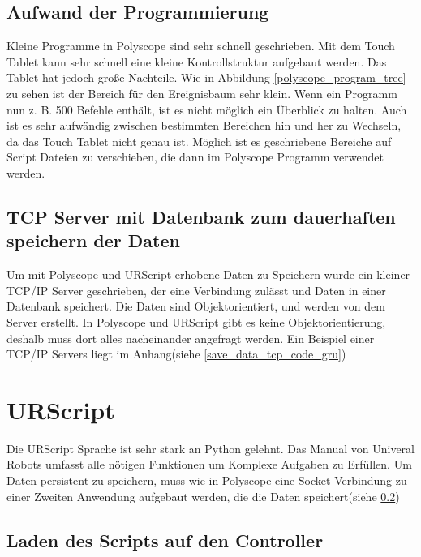\subsection{Aufwand der Programmierung}
\label{polyscope_aufwand}

Kleine Programme in Polyscope sind sehr schnell geschrieben. Mit dem Touch Tablet kann sehr schnell eine kleine Kontrollstruktur aufgebaut werden. Das Tablet hat jedoch große Nachteile. Wie in Abbildung \ref{polyscope_program_tree} zu sehen ist der Bereich für den Ereignisbaum sehr klein. Wenn ein Programm nun z. B. 500 Befehle enthält, ist es nicht möglich ein Überblick zu halten. Auch ist es sehr aufwändig zwischen bestimmten Bereichen hin und her zu Wechseln, da das Touch Tablet nicht genau ist. Möglich ist es geschriebene Bereiche auf Script Dateien zu verschieben, die dann im Polyscope Programm verwendet werden. 

\subsection{TCP Server mit Datenbank zum dauerhaften speichern der Daten}
\label{tcp_datentank_sicherung_rel}

Um mit Polyscope und URScript erhobene Daten zu Speichern wurde ein kleiner \ac{TCP/IP} Server geschrieben, der eine Verbindung zulässt und Daten in einer Datenbank speichert. Die Daten sind Objektorientiert, und werden von dem Server erstellt.
In Polyscope und URScript gibt es keine Objektorientierung, deshalb muss dort alles nacheinander angefragt werden.
Ein Beispiel einer \ac{TCP/IP} Servers liegt im Anhang(siehe \ref{save_data_tcp_code_gru})

\section{URScript}
\label{sec:ur_script_rel}

Die URScript Sprache ist sehr stark an Python gelehnt.
Das Manual von Univeral Robots umfasst alle nötigen Funktionen um Komplexe Aufgaben zu Erfüllen.
Um Daten persistent zu speichern, muss wie in Polyscope eine \ac{Socket} Verbindung zu einer Zweiten Anwendung aufgebaut werden, die die Daten speichert(siehe \ref{tcp_datentank_sicherung_rel})

\subsection{Laden des Scripts auf den Controller}
\label{load_script_rel}

